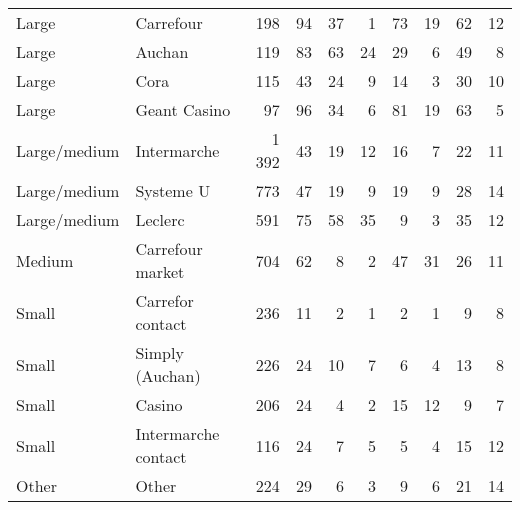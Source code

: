 \documentclass[english]{article}
\begin{document}
\begin{table}
\begin{threeparttable}
\begin{tabular}{llr|r|rr|rr|rr}
    Large & Carrefour & 198   & 94    & 37    & 1     & 73    & 19    & 62    & 12 \\
    Large & Auchan & 119   & 83    & 63    & 24    & 29    & 6     & 49    & 8 \\
    Large & Cora  & 115   & 43    & 24    & 9     & 14    & 3     & 30    & 10 \\
    Large & Geant Casino & 97    & 96    & 34    & 6     & 81    & 19    & 63    & 5 \\
    Large/medium & Intermarche & 1 392 & 43    & 19    & 12    & 16    & 7     & 22    & 11 \\
    Large/medium & Systeme U & 773   & 47    & 19    & 9     & 19    & 9     & 28    & 14 \\
    Large/medium & Leclerc & 591   & 75    & 58    & 35    & 9     & 3     & 35    & 12 \\
    Medium & Carrefour market & 704   & 62    & 8     & 2     & 47    & 31    & 26    & 11 \\
    Small & Carrefor contact & 236   & 11    & 2     & 1     & 2     & 1     & 9     & 8 \\
    Small & Simply (Auchan) & 226   & 24    & 10    & 7     & 6     & 4     & 13    & 8 \\
    Small & Casino & 206   & 24    & 4     & 2     & 15    & 12    & 9     & 7 \\
    Small & Intermarche contact & 116   & 24    & 7     & 5     & 5     & 4     & 15    & 12 \\
    Other & Other & 224   & 29    & 6     & 3     & 9     & 6     & 21    & 14 \\
    \bottomrule
    \bottomrule
\end{tabular}
\end{threeparttable}
\end{table}
\end{document}
